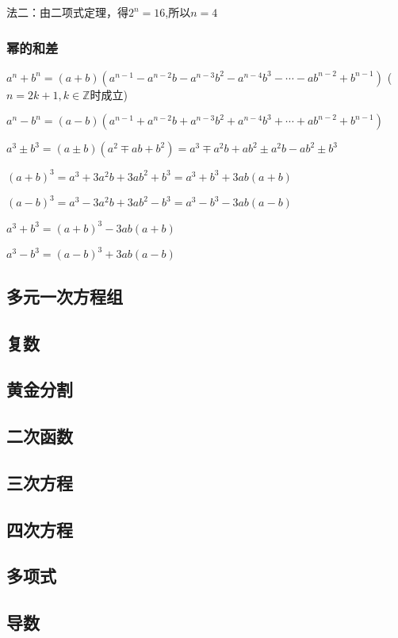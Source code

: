 \documentclass[UTF8]{ctexart}
\begin{document}
法二：由二项式定理，得$2^{n} =16$,所以$ n=4$


\subsubsection{幂的和差}

$a^{n} +b^{n} =(a+b)(a^{n-1} -a^{n-2} b-a^{n-3} b^{2} -a^{n-4}b^{3} -\cdots -ab^{n-2} +b^{n-1} )$
($n=2k+1,k\in \mathbb{Z}$时成立)

$a^{n} -b^{n} =(a-b)(a^{n-1} +a^{n-2} b+a^{n-3} b^{2} +a^{n-4}b^{3} +\cdots +ab^{n-2} +b^{n-1} )$

$a^{3} \pm b^{3} =(a\pm b)(a^{2} \mp ab+b^{2} )=a^{3} \mp a^{2}b+ab^{2}\pm a^{2} b -ab^{2}\pm
b^{3} $

$(a+b)^{3} =a^{3} +3a^{2} b+3ab^{2} +b^{3} =a^{3} +b^{3} +3ab(a+b)$

$(a-b)^{3} =a^{3} -3a^{2} b+3ab^{2} -b^{3} =a^{3} -b^{3} -3ab(a-b)$

$a^{3} +b^{3} =(a+b)^{3} -3ab(a+b)$

$a^{3} -b^{3} =(a-b)^{3} +3ab(a-b)$

\newpage

\subsection{多元一次方程组}
\subsection{复数}
\subsection{黄金分割}
\subsection{二次函数}
\subsection{三次方程}
\subsection{四次方程}
\subsection{多项式}
\subsection{导数}
\end{document}
